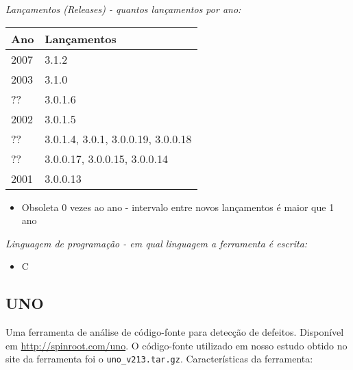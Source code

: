\begin{description}

  \item {\it Lançamentos ({\it Releases}) - quantos lançamentos por ano:}
    \begin{table}[h!]
      \centering
      \begin{tabular}{| l | l |}
        \hline
        Ano  & Lançamentos                        \\
        \hline
        2007 & 3.1.2                              \\
        2003 & 3.1.0                              \\
        ??   & 3.0.1.6                            \\
        2002 & 3.0.1.5                            \\
        ??   & 3.0.1.4, 3.0.1, 3.0.0.19, 3.0.0.18 \\
        ??   & 3.0.0.17, 3.0.0.15, 3.0.0.14       \\
        2001 & 3.0.0.13                           \\
        \hline
      \end{tabular}
    \end{table}
    \begin{itemize}
      \item Obsoleta $0$ vezes ao ano - intervalo entre novos lançamentos é maior que 1 ano
    \end{itemize}

  \item {\it Linguagem de programação - em qual linguagem a ferramenta é escrita:}
    \begin{itemize}
      \item C
    \end{itemize}

\end{description}

\subsection{UNO}

Uma ferramenta de análise de código-fonte para detecção de defeitos.
Disponível em \url{http://spinroot.com/uno}. O código-fonte utilizado em nosso
estudo obtido no site da ferramenta foi o \texttt{uno\_v213.tar.gz}.
Características da ferramenta:

